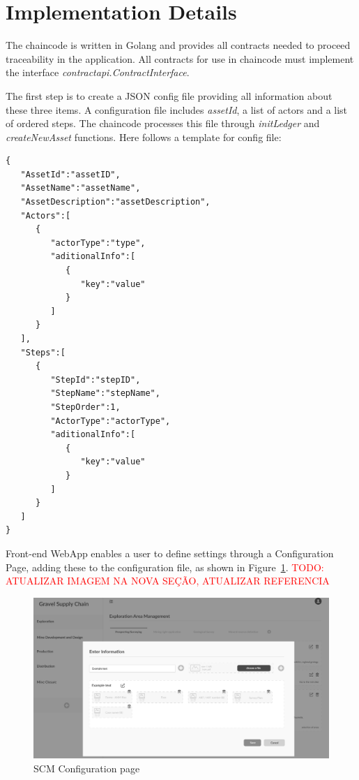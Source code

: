 \section{Implementation Details}\label{sec:Implementation}

The chaincode is written in Golang and provides all contracts needed to proceed traceability in the application. All contracts for use in chaincode must implement the interface \textit{contractapi.ContractInterface}. 

The first step is to create a JSON config file providing all information about these three items. A configuration file includes \textit{assetId}, a list of actors and a list of ordered steps. The chaincode processes this file through  \textit{initLedger} and \textit{createNewAsset} functions. Here follows a template for config file:  

\begin{verbatim}
{
   "AssetId":"assetID",
   "AssetName":"assetName",
   "AssetDescription":"assetDescription",
   "Actors":[
      {
         "actorType":"type",
         "aditionalInfo":[
            {
               "key":"value"
            }
         ]
      }
   ],
   "Steps":[
      {
         "StepId":"stepID",
         "StepName":"stepName",
         "StepOrder":1,
         "ActorType":"actorType",
         "aditionalInfo":[
            {
               "key":"value"
            }
         ]
      }
   ]
}
\end{verbatim}

Front-end WebApp enables a user to define settings through a Configuration Page, adding these to the configuration file, as shown in Figure~\ref{fig:frontend02}.
\textcolor{red}{TODO: ATUALIZAR IMAGEM NA NOVA SEÇÃO, ATUALIZAR REFERENCIA}

\begin{figure}[ht]
\begin{center}
  \includegraphics[scale=0.265]{images/frontend02.png}
\caption{SCM Configuration page}
\label{fig:frontend02}
\end{center}
\end{figure}

